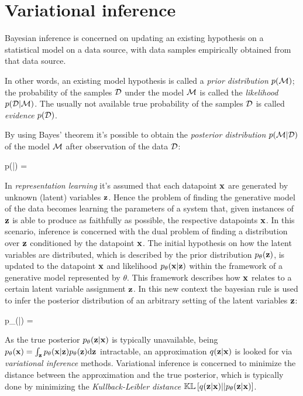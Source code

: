 \section{Variational inference}

Bayesian inference is concerned on updating an existing hypothesis on a statistical model
on a data source, with data samples empirically obtained from that data source.

In other words, an existing model hypothesis is called a \emph{prior distribution} $p(\mathcal{M})$; 
the probability of the samples $\mathcal{D}$ under the model $\mathcal{M}$ is called the \emph{likelihood} $p(\mathcal{D}|\mathcal{M})$. The usually not available true probability of the samples $\mathcal{D}$ is called \emph{evidence} $p(\mathcal{D})$.

By using Bayes' theorem it's possible to obtain the \emph{posterior distribution} $p(\mathcal{M}|\mathcal{D})$ of the model $\mathcal{M}$ after observation of the data $\mathcal{D}$:

\begin{nalign}
p(\model|\dataset) = 
\end{nalign}

In \emph{representation learning} it's assumed that each datapoint $\mathbf{x}$
are generated by unknown (latent) variables $\mathbf{z}$. Hence the problem
of finding the generative model of the data becomes
learning the parameters of a system that, given instances of $\mathbf{z}$
is able to produce as faithfully as possible, the respective datapoints $\mathbf{x}$.
In this scenario, inference is concerned with the dual problem
of finding a distribution over $\mathbf{z}$ conditioned by the datapoint $\mathbf{x}$.
The initial hypothesis on how the latent variables are distributed, 
which is described by the prior distribution $p_\theta(\mathbf{z})$,
is updated to the datapoint $\mathbf{x}$ and likelihood $p_\theta(\mathbf{x}|\mathbf{z})$
within the framework of a generative model represented by $\theta$.
This framework describes how $\mathbf{x}$ relates to a certain latent variable assignment $\mathbf{z}$.
In this new context the bayesian rule is used to infer the posterior distribution
of an arbitrary setting of the latent variables $\mathbf{z}$:

\begin{nalign}
p_\theta(\boldz|\boldx) = 
\end{nalign}

As the true posterior $p_\theta(\mathbf{z}|\mathbf{x})$ is typically unavailable,
being $p_\theta(\mathbf{x}) = \int_{\mathbf{z}} p_\theta(\mathbf{x}|\mathbf{z})p_\theta(\mathbf{z}) \mathrm{d}\mathbf{z}$
intractable,
an approximation $q(\mathbf{z}|\mathbf{x})$ is looked for
via \emph{variational inference} methods.
Variational inference is concerned to
minimize the distance between the approximation and the true posterior\cite{Fox2012},
which is typically done by minimizing the \emph{Kullback-Leibler distance}
$\mathbb{KL}\left[ q(\mathbf{z}|\mathbf{x}) || p_\theta(\mathbf{z}|\mathbf{x}) \right]$.

